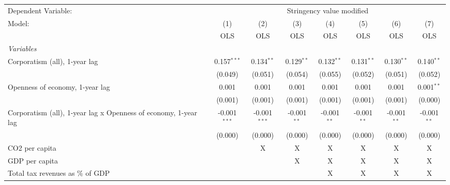 
\begingroup
\centering
\begin{tabular}{lccccccc}
   \toprule
   Dependent Variable: & \multicolumn{7}{c}{Stringency value modified}\\
   Model:                                                          & (1)            & (2)            & (3)           & (4)           & (5)           & (6)           & (7)\\  
                                                                   &  OLS           & OLS            & OLS           & OLS           & OLS           & OLS           & OLS\\  
   \midrule
   \emph{Variables}\\
   Corporatism (all), 1-year lag                                   & 0.157$^{***}$  & 0.134$^{**}$   & 0.129$^{**}$  & 0.132$^{**}$  & 0.131$^{**}$  & 0.130$^{**}$  & 0.140$^{**}$\\   
                                                                   & (0.049)        & (0.051)        & (0.054)       & (0.055)       & (0.052)       & (0.051)       & (0.052)\\   
   Openness of economy, 1-year lag                                 & 0.001          & 0.001          & 0.001         & 0.001         & 0.001         & 0.001         & 0.001$^{**}$\\   
                                                                   & (0.001)        & (0.001)        & (0.001)       & (0.001)       & (0.001)       & (0.001)       & (0.000)\\   
   Corporatism (all), 1-year lag x Openness of economy, 1-year lag & -0.001$^{***}$ & -0.001$^{***}$ & -0.001$^{**}$ & -0.001$^{**}$ & -0.001$^{**}$ & -0.001$^{**}$ & -0.001$^{**}$\\   
                                                                   & (0.000)        & (0.000)        & (0.000)       & (0.000)       & (0.000)       & (0.000)       & (0.000)\\   
   CO2 per capita                                                  &                & X              & X             & X             & X             & X             & X\\  
   GDP per capita                                                  &                &                & X             & X             & X             & X             & X\\  
   Total tax revenues as \% of GDP                                 &                &                &               & X             & X             & X             & X\\  

\end{tabular}
